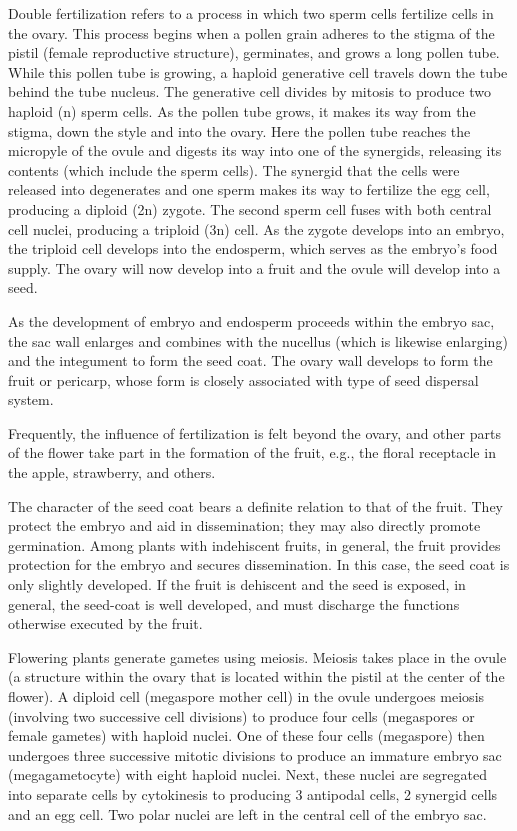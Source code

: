 \documentclass[]{book}
\theoremstyle{definition}
\theoremstyle{definition}
\theoremstyle{definition}
\theoremstyle{remark}
\begin{document}
Double fertilization refers to a process in which two sperm cells
fertilize cells in the ovary. This process begins when a pollen grain
adheres to the stigma of the pistil (female reproductive structure),
germinates, and grows a long pollen tube. While this pollen tube is
growing, a haploid generative cell travels down the tube behind the tube
nucleus. The generative cell divides by mitosis to produce two haploid
(n) sperm cells. As the pollen tube grows, it makes its way from the
stigma, down the style and into the ovary. Here the pollen tube reaches
the micropyle of the ovule and digests its way into one of the
synergids, releasing its contents (which include the sperm cells). The
synergid that the cells were released into degenerates and one sperm
makes its way to fertilize the egg cell, producing a diploid (2n)
zygote. The second sperm cell fuses with both central cell nuclei,
producing a triploid (3n) cell. As the zygote develops into an embryo,
the triploid cell develops into the endosperm, which serves as the
embryo's food supply. The ovary will now develop into a fruit and the
ovule will develop into a seed.

As the development of embryo and endosperm proceeds within the embryo
sac, the sac wall enlarges and combines with the nucellus (which is
likewise enlarging) and the integument to form the seed coat. The ovary
wall develops to form the fruit or pericarp, whose form is closely
associated with type of seed dispersal system.

Frequently, the influence of fertilization is felt beyond the ovary, and
other parts of the flower take part in the formation of the fruit, e.g.,
the floral receptacle in the apple, strawberry, and others.

The character of the seed coat bears a definite relation to that of the
fruit. They protect the embryo and aid in dissemination; they may also
directly promote germination. Among plants with indehiscent fruits, in
general, the fruit provides protection for the embryo and secures
dissemination. In this case, the seed coat is only slightly developed.
If the fruit is dehiscent and the seed is exposed, in general, the
seed-coat is well developed, and must discharge the functions otherwise
executed by the fruit.

Flowering plants generate gametes using meiosis. Meiosis takes place in the ovule (a structure within the
ovary that is located within the pistil at the center of the flower). A
diploid cell (megaspore mother cell) in the ovule undergoes meiosis
(involving two successive cell divisions) to produce four cells
(megaspores or female gametes) with haploid nuclei. One of these four
cells (megaspore) then undergoes three successive mitotic divisions to
produce an immature embryo sac (megagametocyte) with eight haploid
nuclei. Next, these nuclei are segregated into separate cells by
cytokinesis to producing 3 antipodal cells, 2 synergid cells and an egg
cell. Two polar nuclei are left in the central cell of the embryo sac.
\end{document}
